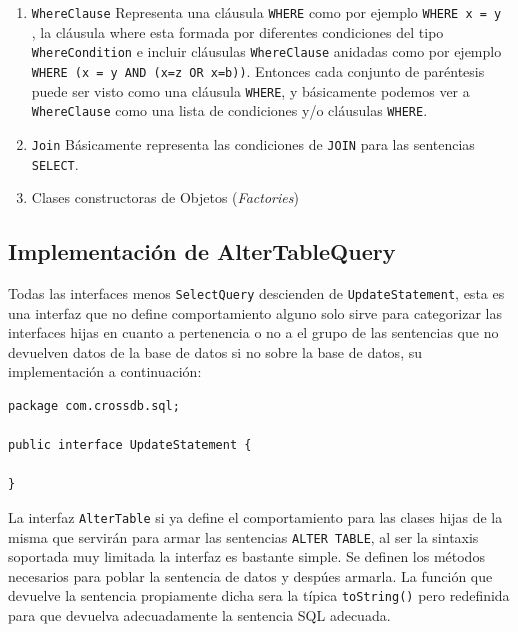 \begin{enumerate}
\item \verb=WhereClause=  Representa una cláusula \verb=WHERE= como por ejemplo \verb|WHERE x = y | , la cláusula where esta formada por diferentes condiciones del tipo \verb=WhereCondition= e incluir cláusulas \verb=WhereClause= anidadas como por ejemplo \verb|WHERE (x = y AND (x=z OR x=b))|. Entonces cada conjunto de paréntesis puede ser visto como una cláusula \verb=WHERE=, y básicamente podemos ver a \verb=WhereClause= como una lista de condiciones y/o cláusulas \verb=WHERE=.

\item \verb=Join= Básicamente representa las condiciones de \verb=JOIN= para las sentencias \verb=SELECT=.

\item Clases constructoras de Objetos (\textit{Factories})

\end{enumerate}


\subsection{Implementación de AlterTableQuery}
Todas las interfaces menos \verb=SelectQuery= descienden de \verb=UpdateStatement=, esta es una interfaz que no define comportamiento alguno solo sirve para categorizar las interfaces hijas en cuanto a pertenencia o no a el grupo de las sentencias que no devuelven datos de la base de datos si no sobre la base de datos, su implementación a continuación:

\begin{lstlisting}[title=interfaz UpdateStatement]
package com.crossdb.sql;

public interface UpdateStatement {

}
\end{lstlisting}

La interfaz \verb=AlterTable= si ya define el comportamiento para las clases hijas de la misma que servirán para armar las sentencias \verb=ALTER TABLE=, al ser la sintaxis soportada muy limitada la interfaz es bastante simple. Se definen los métodos necesarios para poblar la sentencia de datos y despúes armarla. La función que devuelve la sentencia propiamente dicha sera la típica \verb=toString()= pero redefinida para que devuelva adecuadamente la sentencia SQL adecuada. 


